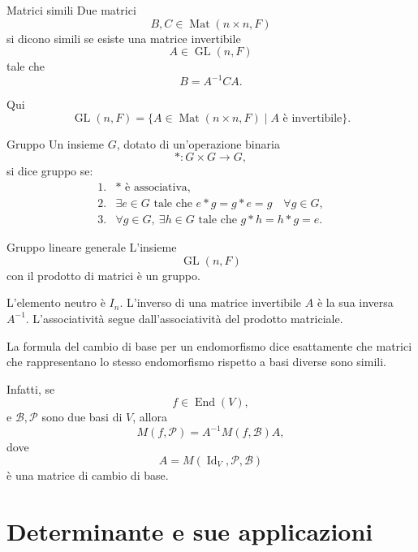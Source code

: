 \documentclass[a4paper]{article}
\begin{document}
\begin{snippetdefinition}{Matrici simili}
    Due matrici
    \[
        B,C\in\operatorname{Mat}(n\times n,F)
    \]
    si dicono simili se esiste una matrice invertibile
    \[
        A\in\operatorname{GL}(n,F)
    \]
    tale che
    \[
        B=A^{-1}CA.
    \]
\end{snippetdefinition}

Qui
\[
    \operatorname{GL}(n,F)
    =
    \{A\in\operatorname{Mat}(n\times n,F)\mid A \text{ è invertibile}\}.
\]

\begin{snippetdefinition}{Gruppo}
    Un insieme \(G\), dotato di un'operazione binaria
    \[
        * : G\times G\to G,
    \]
    si dice gruppo se:
    \[
        \begin{array}{ll}
            \text{1.} & \text{\(*\) è associativa},\\
            \text{2.} & \exists e\in G \text{ tale che } e*g=g*e=g \quad \forall g\in G,\\
            \text{3.} & \forall g\in G,\ \exists h\in G \text{ tale che } g*h=h*g=e.
        \end{array}
    \]
\end{snippetdefinition}

\begin{snippetexample}{Gruppo lineare generale}
    L'insieme
    \[
        \operatorname{GL}(n,F)
    \]
    con il prodotto di matrici è un gruppo.

    L'elemento neutro è \(I_n\). L'inverso di una matrice invertibile \(A\) è la sua inversa \(A^{-1}\). L'associatività segue dall'associatività del prodotto matriciale.
\end{snippetexample}

\begin{snippetremark}{}
    La formula del cambio di base per un endomorfismo dice esattamente che matrici che rappresentano lo stesso endomorfismo rispetto a basi diverse sono simili.

    Infatti, se
    \[
        f\in\operatorname{End}(V),
    \]
    e \(\mathcal{B},\mathcal{P}\) sono due basi di \(V\), allora
    \[
        M(f,\mathcal{P})
        =
        A^{-1}M(f,\mathcal{B})A,
    \]
    dove
    \[
        A=M(\operatorname{Id}_V,\mathcal{P},\mathcal{B})
    \]
    è una matrice di cambio di base.
\end{snippetremark}

\section{Determinante e sue applicazioni}
\end{document}
